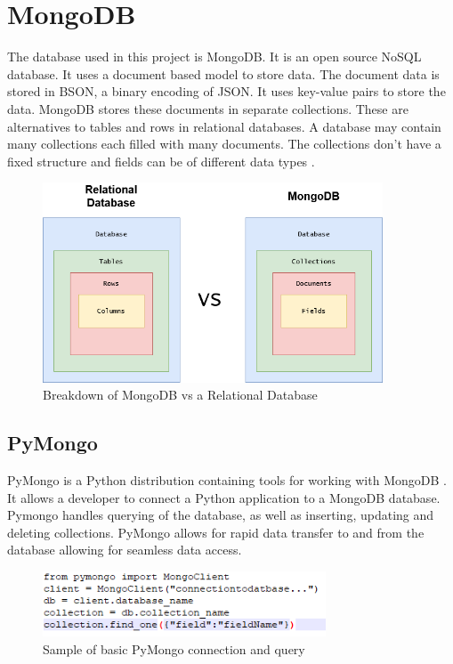 \section{MongoDB}
The database used in this project is MongoDB. It is an open source NoSQL database. It uses a document based model to store data. The document data is stored in BSON, a binary encoding of JSON. It uses key-value pairs to store the data. MongoDB stores these documents in separate collections. These are alternatives to tables and rows in relational databases. A database may contain many collections each filled with many documents. The collections don’t have a fixed structure and fields can be of different data types \cite{boicea2012mongodb}.
\begin{figure}[h!]
 	\caption{Breakdown of MongoDB vs a Relational Database}
	\label{image:mongo}
 	\centering
 	\includegraphics[width=0.9\textwidth]{Images/mongodb vs rdbms.png}
\end{figure}
\newpage

\subsection{PyMongo}
PyMongo is a Python distribution containing tools for working with MongoDB \cite{pedersen2014mining}. It allows a developer to connect a Python application to a MongoDB database. Pymongo handles querying of the database, as well as inserting, updating and deleting collections. PyMongo allows for rapid data transfer to and from the database allowing for seamless data access.
\begin{figure}[h!]
 	\caption{Sample of basic PyMongo connection and query}
	\label{image:pymongo}
 	\centering
 	\includegraphics[width=0.75\textwidth]{Images/pymongosample.PNG}
\end{figure}
\newpage

